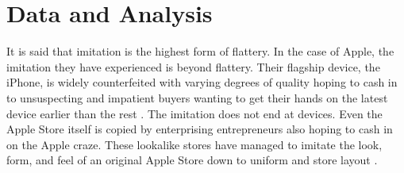 \chapter{Data and Analysis}

It is said that imitation is the highest form of flattery. In the case of Apple,
the imitation they have experienced is beyond flattery. Their flagship device,
the iPhone, is widely counterfeited with varying degrees of quality hoping to
cash in to unsuspecting and impatient buyers wanting to get their hands on the
latest device earlier than the rest \autocite{justice_iphone_2015}. The imitation
does not end at devices. Even the Apple Store itself is copied by enterprising
entrepreneurs also hoping to cash in on the Apple craze. These lookalike stores
have managed to imitate the look, form, and feel of an original Apple Store down
to uniform and store layout \autocite{lee_chinas_2015}.


%


